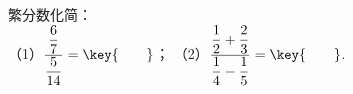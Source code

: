 繁分数化简：\\（1）$\dfrac{\dfrac{6}{7}}{\dfrac{5}{14}}=\key{\qquad}$；\hspace{3cm}
（2）$\dfrac{\dfrac{1}{2}+\dfrac{2}{3}}{\dfrac{1}{4}-\dfrac{1}{5}}=\key{\qquad}$.